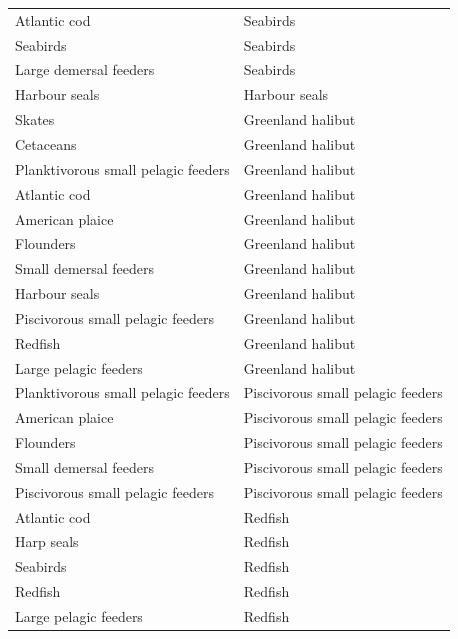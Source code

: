 \begin{singlespace}
\begin{table}[h!]
\begin{tabular}{|l|l|}
      Atlantic cod                        & Seabirds  \\
      Seabirds                            & Seabirds  \\
      Large demersal feeders              & Seabirds  \\
      Harbour seals                       & Harbour seals \\
      Skates                              & Greenland halibut \\
      Cetaceans                           & Greenland halibut \\
      Planktivorous small pelagic feeders & Greenland halibut \\
      Atlantic cod                        & Greenland halibut \\
      American plaice                     & Greenland halibut \\
      Flounders                           & Greenland halibut \\
      Small demersal feeders              & Greenland halibut \\
      Harbour seals                       & Greenland halibut \\
      Piscivorous small pelagic feeders   & Greenland halibut \\
      Redfish                             & Greenland halibut \\
      Large pelagic feeders               & Greenland halibut \\
      Planktivorous small pelagic feeders & Piscivorous small pelagic feeders \\
      American plaice                     & Piscivorous small pelagic feeders \\
      Flounders                           & Piscivorous small pelagic feeders \\
      Small demersal feeders              & Piscivorous small pelagic feeders \\
      Piscivorous small pelagic feeders   & Piscivorous small pelagic feeders \\
      Atlantic cod                        & Redfish   \\
      Harp seals                          & Redfish   \\
      Seabirds                            & Redfish   \\
      Redfish                             & Redfish   \\
      Large pelagic feeders               & Redfish   \\

\end{tabular}
\end{table}
\end{singlespace}
